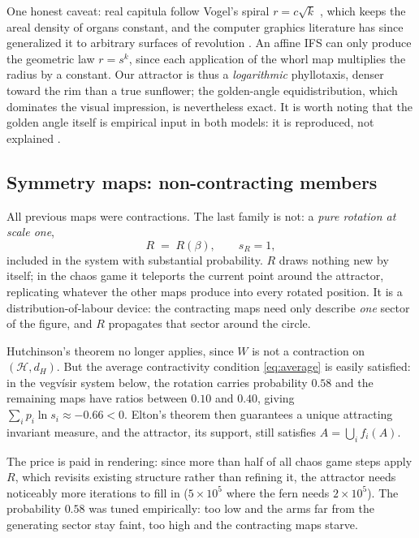 \documentclass[11pt,a4paper]{article}
\theoremstyle{remark}
\newcommand{\Hs}{\mathcal{H}}
\begin{document}
One honest caveat: real capitula follow Vogel's spiral $r = c\sqrt{k}$
\cite{vogel1979}, which keeps the areal density of organs constant, and the
computer graphics literature has since generalized it to arbitrary surfaces
of revolution \cite{ridley1986,prusinkiewicz2003}. An affine IFS can only
produce the geometric law $r = s^k$, since each application of the whorl map
multiplies the radius by a constant. Our attractor is thus a
\emph{logarithmic} phyllotaxis, denser toward the rim than a true sunflower;
the golden-angle equidistribution, which dominates the visual impression, is
nevertheless exact. It is worth noting that the golden angle itself is
empirical input in both models: it is reproduced, not explained
\cite{prusinkiewicz2003}.

\subsection{Symmetry maps: non-contracting members}
\label{sec:symmetry}

All previous maps were contractions. The last family is not: a \emph{pure
rotation at scale one},
\[
R \;=\; R(\beta), \qquad s_R = 1,
\]
included in the system with substantial probability. $R$ draws nothing new
by itself; in the chaos game it teleports the current point around the
attractor, replicating whatever the other maps produce into every rotated
position. It is a distribution-of-labour device: the contracting maps need
only describe \emph{one} sector of the figure, and $R$ propagates that
sector around the circle.

Hutchinson's theorem no longer applies, since $W$ is not a contraction on
$(\Hs, d_H)$. But the average contractivity condition \eqref{eq:average} is
easily satisfied: in the vegvísir system below, the rotation carries
probability $0.58$ and the remaining maps have ratios between $0.10$ and
$0.40$, giving $\sum_i p_i \ln s_i \approx -0.66 < 0$. Elton's theorem
\cite{elton1987} then guarantees a unique attracting invariant measure, and
the attractor, its support, still satisfies $A = \bigcup_i f_i(A)$.

The price is paid in rendering: since more than half of all chaos game steps
apply $R$, which revisits existing structure rather than refining it, the
attractor needs noticeably more iterations to fill in ($5\times 10^5$ where
the fern needs $2\times 10^5$). The probability $0.58$ was tuned
empirically: too low and the arms far from the generating sector stay
faint, too high and the contracting maps starve.
\end{document}
